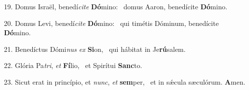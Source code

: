 19. Domus Israël, benedí\textit{ci}\textit{te} \textbf{Dó}mino: \ast\  domus Aaron, benedícite \textbf{Dó}mino.\

20. Domus Levi, benedí\textit{ci}\textit{te} \textbf{Dó}mino: \ast\  qui timétis Dóminum, benedícite \textbf{Dó}mino.\

21. Benedíctus Dómi\textit{nus} \textit{ex} \textbf{Si}on, \ast\  qui hábitat in Je\textbf{rú}salem.\

22. Glória Pa\textit{tri}, \textit{et} \textbf{Fí}lio, \ast\  et Spirítui \textbf{Sanc}to.\

23. Sicut erat in princípio, et \textit{nunc}, \textit{et} \textbf{sem}per, \ast\  et in sǽcula sæculórum. \textbf{A}men.\

